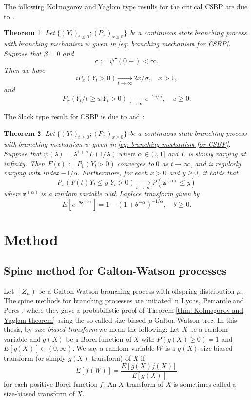 \documentclass[UTF8]{pkuthss}
\theoremstyle{plain}
\newtheorem{thm}{Theorem}[section]
\theoremstyle{definition}
\numberwithin{equation}{section}
\begin{document}
	The following Kolmogorov and Yaglom type results for the critical CSBP are due to \cite{Li2000Asymptotic}.
\begin{thm}
	Let $\{(Y_t)_{t\geq 0}; (P_x)_{x\geq 0}\}$ be a continuous state branching process with branching mechanism $\psi$ given in \eqref{eq: branching mechanism for CSBP}. Suppose that $\beta = 0$ and 
\[
	\sigma := \psi''(0+) < \infty.
\]
	Then we have
\[
	t P_x(Y_t > 0) \xrightarrow[t\to \infty]{} 2x/\sigma, \quad x> 0,
\]
	and 
\[
	P_x( Y_t/t \geq u |Y_t>0) \xrightarrow[t\to \infty]{} e^{-2u/\sigma},\quad u\geq 0.
\]
\end{thm}
	The Slack type result for CSBP is due to \cite{KyprianouPardo2008Continuous} and \cite{RenYangZhao2014Conditional}:
\begin{thm}
	Let $\{(Y_t)_{t\geq 0}; (P_x)_{x\geq 0}\}$ be a continuous state branching process with branching mechanism $\psi$ given in \eqref{eq: branching mechanism for CSBP}. 
	Suppose that $\psi(\lambda)= \lambda^{1+\alpha}L(1/\lambda)$ where $\alpha \in (0,1]$ and $L$ is slowly varying at infinity. Then $F(t):= P_1(Y_t >0)$ converges to $0$ as $t\to \infty$, and is regularly varying with index $-1/\alpha$. Furthermore, for each $x>0$ and $y\geq 0$, it holds that
\[
	P_x(F(t)Y_t\leq y|Y_t>0) \xrightarrow[t\to \infty]{} P(\mathbf z^{(\alpha)}\leq y)
\]
	where $\mathbf z^{(\alpha)}$ is a random variable with Laplace transform given by
\[
	E[e^{-\theta \mathbf z^{(\alpha)}}] = 1-(1+\theta^{-\alpha})^{-1/\alpha},\quad \theta \geq0.
\]
\end{thm}

\section{Method}
\subsection{Spine method for Galton-Watson processes}
\label{sec: Methods}
	Let $(Z_n)$ be a Galton-Watson branching process with offspring distribution $\mu$. The spine methods for branching processes are initiated in Lyons, Pemantle and Peres \cite{LyonsPemantlePeres1995Conceptual}, where they gave a probabilistic proof of Theorem \ref{thm: Kolmogorov and Yaglom theorem} using the so-called size-biased $\mu$-Galton-Watson tree.
In this thesis, by \emph{size-biased transform} we mean the following:
Let $X$ be a random variable
and $g(X)$ be a Borel function of $X$ with $P(g(X) \geq 0) = 1$ and $E[g(X)]\in (0,\infty)$.
We say a random variable $W$ is
a $g(X)$-size-biased transform (or simply $g(X)$-transform) of $X$ if
\[
E[f( W )]
= \frac{ E[g(X)f(X)]}{E[g(X)]}
\]
for each positive Borel function $f$.
An $X$-transform of $X$ is sometimes called a size-biased transform of $X$.
\end{document}
